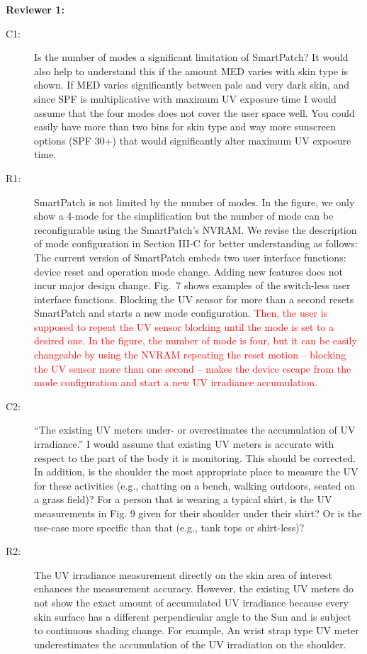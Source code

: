 \documentclass[onecolumn]{IEEEconf}
\begin{document}
\setlength{\parindent}{0cm}
\textbf{Reviewer 1:}
\begin{description}
\item [C1: ] Is the number of modes a significant limitation of SmartPatch? It would also help to understand this if the amount MED varies with skin type is shown. If MED varies significantly between pale and very dark skin, and since SPF is multiplicative with maximum UV exposure time I would assume that the four modes does not cover the user space well. You could easily have more than two bins for skin type and way more sunscreen options (SPF 30+) that would significantly alter maximum UV exposure time.  
\item [R1: ] SmartPatch is not limited by the number of modes. In the figure, we only show a 4-mode for the simplification but the number of mode can be reconfigurable using the SmartPatch's NVRAM. We revise the description of mode configuration in Section
III-C for better understanding as follows:\\

The current version of SmartPatch embeds two user interface functions: device reset and operation mode change.
Adding new features does not incur major design change.
Fig.~7 shows examples of the switch-less user interface functions.
Blocking the UV sensor for more than a second resets SmartPatch and starts a new mode configuration.
\textcolor{red}{Then, the user is supposed to repeat the UV sensor blocking until the mode is set to a desired one. In the figure, the number of mode is four, but it can be easily changeable by using the NVRAM
repeating the reset motion -- blocking the UV sensor more than one second -- makes the device escape from the mode configuration and start a new UV irradiance accumulation.}~\\

\item [C2: ] ``The existing UV meters under- or overestimates the accumulation of UV irradiance.'' I would assume that existing UV meters is accurate with respect to the part of the body it is monitoring. This should be corrected. In addition, is the shoulder the most appropriate place to measure the UV for these activities (e.g., chatting on a bench, walking outdoors, seated on a grass field)? For a person that is wearing a typical shirt, is the UV measurements in Fig. 9 given for their shoulder under their shirt? Or is the use-case more specific than that (e.g., tank tops or shirt-less)?
\item [R2: ] The UV irradiance measurement directly on the skin area of interest enhances the measurement accuracy. However, the existing UV meters do not show the exact amount of accumulated UV irradiance because every skin surface has a different perpendicular angle to the Sun and is subject to continuous shading change. For example, An wrist strap type UV meter underestimates the accumulation of the UV irradiation on the shoulder. 
~\\


\end{description}
\end{document}
